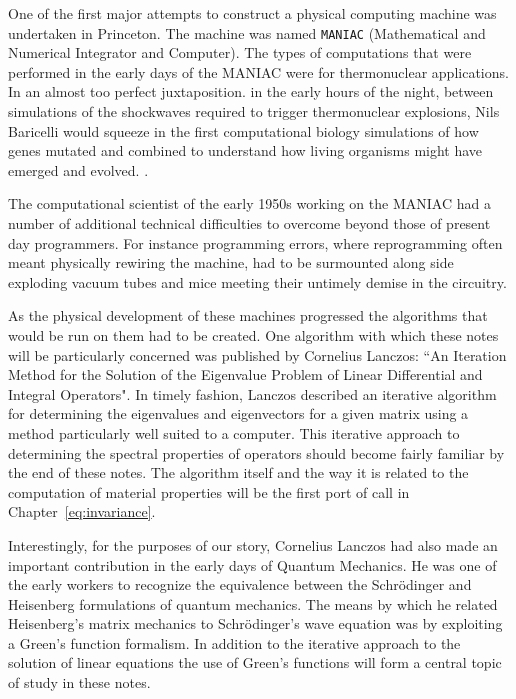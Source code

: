 One of the first major attempts to construct a physical computing machine was 
undertaken in Princeton. The machine was named \texttt{MANIAC} 
(Mathematical and Numerical Integrator and Computer).
The types of computations that were performed in the early days of the MANIAC 
were for thermonuclear applications. In an almost too perfect juxtaposition.
in the early hours of the night, between simulations of 
the shockwaves required to trigger thermonuclear explosions, Nils Baricelli 
would squeeze in the first computational biology simulations of how genes mutated
and combined to understand how living organisms might have emerged
and evolved. \cite{dyson12, barricelli54, barricelli62}.

The computational scientist of the early 1950s working
on the MANIAC had a number of additional 
technical difficulties to overcome beyond those of present day programmers. 
For instance programming errors, where reprogramming often meant physically rewiring
the machine, had to be surmounted along side exploding
vacuum tubes and mice meeting their untimely demise in the circuitry.

As the physical development of these machines progressed 
the algorithms that would be run on them had to be created.
One algorithm with which these notes will be particularly concerned was published by
Cornelius Lanczos: ``An Iteration Method for the Solution of the Eigenvalue Problem of Linear
Differential and Integral Operators"\cite{lanczos50}. In timely fashion, Lanczos described 
an iterative algorithm for determining the eigenvalues and eigenvectors for a given
matrix using a method particularly well suited to a computer. 
This iterative approach to determining the spectral properties of operators 
should become fairly familiar by the end of these notes. 
The algorithm itself and the way it is related to the computation
of material properties will be the first port of call in 
Chapter~\ref{eq:invariance}. 

Interestingly, for the purposes of our story, 
Cornelius Lanczos had also made an important contribution in the early
days of Quantum Mechanics. He was one of the early workers
to recognize the equivalence between the Schr\"odinger and Heisenberg
formulations of quantum mechanics\cite{lanczos26}. %
The means by which he related Heisenberg's matrix mechanics to
Schr\"odinger's wave equation was by exploiting a Green's function formalism. In addition
to the iterative approach to the solution of linear equations the use of Green's functions
will form a central topic of study in these notes. 

